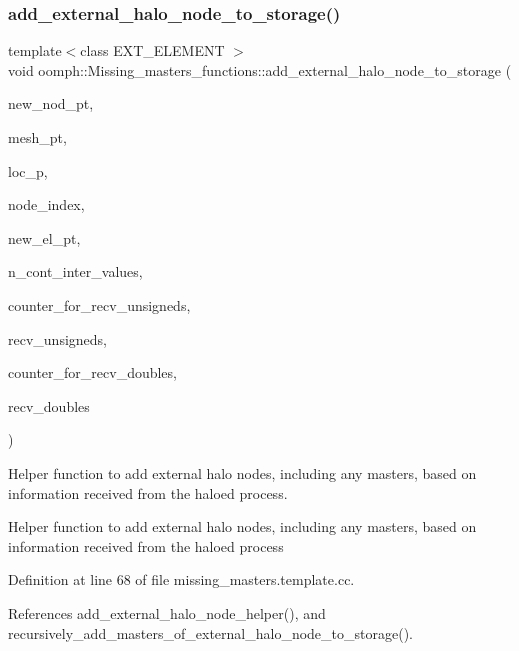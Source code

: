 \subsubsection{\texorpdfstring{add\+\_\+external\+\_\+halo\+\_\+node\+\_\+to\+\_\+storage()}{add\_external\_halo\_node\_to\_storage()}}
{\footnotesize\ttfamily template$<$class E\+X\+T\+\_\+\+E\+L\+E\+M\+E\+NT $>$ \\
void oomph\+::\+Missing\+\_\+masters\+\_\+functions\+::add\+\_\+external\+\_\+halo\+\_\+node\+\_\+to\+\_\+storage (\begin{DoxyParamCaption}\item[{\hyperlink{classoomph_1_1Node}{Node} $\ast$\&}]{new\+\_\+nod\+\_\+pt,  }\item[{\hyperlink{classoomph_1_1Mesh}{Mesh} $\ast$const \&}]{mesh\+\_\+pt,  }\item[{unsigned \&}]{loc\+\_\+p,  }\item[{unsigned \&}]{node\+\_\+index,  }\item[{\hyperlink{classoomph_1_1FiniteElement}{Finite\+Element} $\ast$const \&}]{new\+\_\+el\+\_\+pt,  }\item[{int \&}]{n\+\_\+cont\+\_\+inter\+\_\+values,  }\item[{unsigned \&}]{counter\+\_\+for\+\_\+recv\+\_\+unsigneds,  }\item[{\hyperlink{classoomph_1_1Vector}{Vector}$<$ unsigned $>$ \&}]{recv\+\_\+unsigneds,  }\item[{unsigned \&}]{counter\+\_\+for\+\_\+recv\+\_\+doubles,  }\item[{\hyperlink{classoomph_1_1Vector}{Vector}$<$ double $>$ \&}]{recv\+\_\+doubles }\end{DoxyParamCaption})}



Helper function to add external halo nodes, including any masters, based on information received from the haloed process. 

Helper function to add external halo nodes, including any masters, based on information received from the haloed process 

Definition at line 68 of file missing\+\_\+masters.\+template.\+cc.



References add\+\_\+external\+\_\+halo\+\_\+node\+\_\+helper(), and recursively\+\_\+add\+\_\+masters\+\_\+of\+\_\+external\+\_\+halo\+\_\+node\+\_\+to\+\_\+storage().

\mbox{\label{namespaceoomph_1_1Missing__masters__functions_acd3ecd40c8ebcfdb04f2e26c3fc304cc}} 

